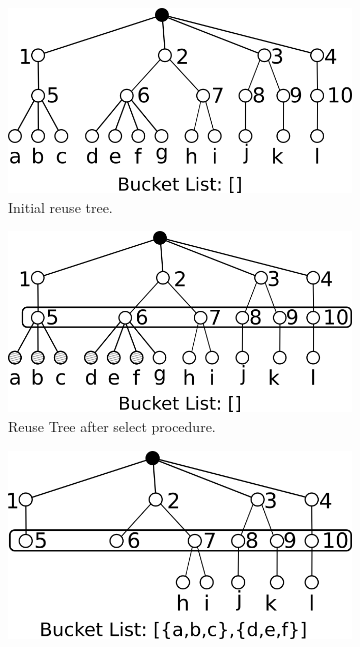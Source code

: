 \begin{figure}[!h]
	 \centering
	 \begin{subfigure}[b]{0.45\textwidth}
			 \includegraphics[width=\textwidth]{img/rg1.png}
			 \caption{Initial reuse tree.}
			 \label{fig:rg1}
	 \end{subfigure}
	 \hspace{3mm}
	 \begin{subfigure}[b]{0.45\textwidth}
				\includegraphics[width=\textwidth]{img/rg2.png}
				\caption{Reuse Tree after select procedure.}
				\label{fig:rg2}
		\end{subfigure}
		\par\bigskip
			 \begin{subfigure}[b]{0.45\textwidth}
				\includegraphics[width=\textwidth]{img/rg2-5.png}

\end{subfigure}
\end{figure}
